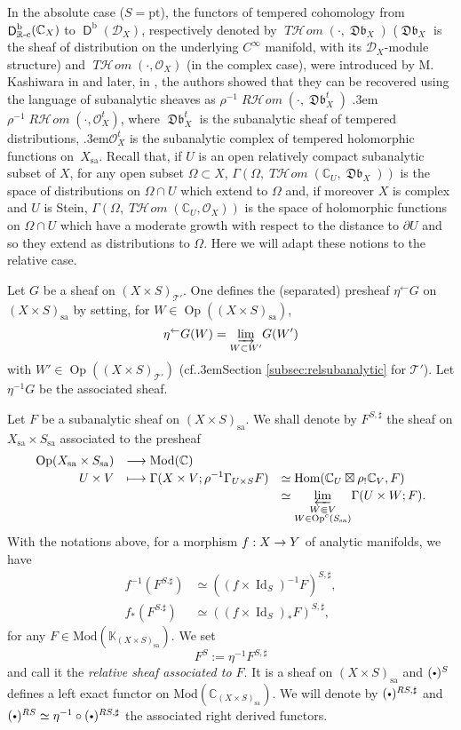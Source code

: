 \documentclass[english]{smfart}
\numberwithin{subsection}{section}
\def\shd{\mathcal{D}}\let\cD\shd
\def\sho{\mathcal{O}}\let\cO\sho
\def\sht{\mathcal{T}}
\newcommand{\C}{\mathbb{C}}\let\CC\C
\newcommand{\R}{\mathbb{R}}\let\RR\R
\newcommand{\shhom}{\mathcal{H}\!\mathit{om}}\let\ho\shhom
\DeclareMathOperator{\rh}{\mathit{R}\shhom}
\DeclareMathOperator{\tho}{\mathit{T}\shhom}
\newcommand{\rb}{\mathrm{b}}
\newcommand{\Mod}{\mathrm{Mod}}
\newcommand{\imin}[1]{#1^{-1}}
\newcommand{\sa}{\mathrm{sa}}
\newcommand{\rc}{{\R\textup{-c}}}
\newcommand{\XS}{X\times S}
\newcommand{\lind}[1]{\underset{#1}{\varinjlim}}
\newcommand{\lpro}[1]{\underset{#1}{\varprojlim}}
\DeclareMathOperator{\rD}{\mathsf{D}}
\DeclareMathOperator{\Db}{\mathfrak{Db}}
\DeclareMathOperator{\Hom}{Hom}
\DeclareMathOperator{\id}{Id}\let\Id\id
\DeclareMathOperator{\Op}{Op}
\def\cf{cf.\kern.3em}
\def\resp{\text{resp.}\kern.3em}
\newcommand{\cbbullet}{{\raisebox{1pt}{$\sbullet$}}}
\newcommand{\sbullet}{{\scriptscriptstyle\bullet}}
\numberwithin{equation}{section}
\theoremstyle{plain}
\theoremstyle{definition}
\def\to{\mathchoice{\longrightarrow}{\rightarrow}{\rightarrow}{\rightarrow}}
\def\mto{\mathchoice{\longmapsto}{\mapsto}{\mapsto}{\mapsto}}
\begin{document}
In the absolute case ($S=\mathrm{pt}$), the functors of tempered cohomology from $\rD^\rb_{\rc}(\C_X)$ to $\rD^\rb(\shd_X)$, respectively denoted by $\tho(\cdot,\Db_X)$ ($\Db_X$ is the sheaf of distribution on the underlying $C^\infty$ manifold, with its $\cD_X$-module structure) and $\tho(\cdot,\sho_X)$ (in the complex case), were introduced by M. Kashiwara in \cite{Kashiwara84} and later, in \cite{K-S01}, the authors showed that they can be recovered using the language of subanalytic sheaves as $\rho^{-1}\rh(\cdot, \Db_X^t)$ \resp $\rho^{-1}\rh(\cdot,\sho_X^t)$, where $\Db_X^t$ is the subanalytic sheaf of tempered distributions, \resp $\sho_X^t$ is the subanalytic complex of tempered holomorphic functions on~$X_{\sa}$.
Recall that, if $U$ is an open relatively compact subanalytic subset of $X$, for any open subset $\Omega\subset X$, $\Gamma(\Omega, \tho(\C_U,\Db_X))$ is the space of distributions on $\Omega\cap U$ which extend to $\Omega$ and, if moreover $X$ is complex and $U$ is Stein, \hbox{$\Gamma(\Omega, \tho(\C_U, \sho_X))$} is the space of holomorphic functions on $\Omega\cap U$ which have a moderate growth with respect to the distance to $\partial U$ and so they extend as distributions to $\Omega$.
Here we will adapt these notions to the relative case.

Let $G$ be a sheaf on $(\XS)_{\sht'}$. One defines the (separated) presheaf $\eta^\gets G$ on $(\XS)_\sa$ by setting, for $W \in \Op((\XS)_\sa)$,
$$
\eta^\gets G(W)= \lind {W \subset W'}G(W')
$$
with $W' \in \Op((\XS)_{\sht'})$ (\cf Section \ref{subsec:relsubanalytic} for $\sht'$). Let $\imin\eta G$ be the associated sheaf.

Let $F$ be a subanalytic sheaf on $(\XS)_\sa$. We shall denote by $F^{S,\sharp}$ the sheaf on $X_\sa \times S_\sa$ associated to the presheaf
\[
\begin{array}{rll}
\Op(X_\sa \times S_\sa) & \displaystyle\to \Mod(\C)& \\[2pt]
U \times V & \displaystyle\mto \Gamma(X \times V;\imin\rho\Gamma_{U \times S}F) &\simeq \Hom(\CC_U \boxtimes \rho_!\CC_V,F) \\[2pt]
&& \simeq \lpro {\substack{W \Subset V\\ W\in\Op^c(S_\sa)}}\Gamma(U \times W;F).
\end{array}
\]
With the notations above, for a morphism $f:X\to Y$ of analytic manifolds, we have
\begin{align*}
f^{-1}(F^{S.\sharp})&\simeq ((f\times \id_S)^{-1}F)^{S,\sharp},\\
f_*(F^{S.\sharp})&\simeq ((f\times \id_S)_*F)^{S,\sharp},
\end{align*}
for any $F\in\Mod(\mathbb{K}_{(\XS)_\sa})$. We set
\begin{equation}\label{E:100}
F^{S}:=\imin\eta F^{S,\sharp}
\end{equation}
and call it the \emph{relative sheaf associated to $F$}. It is a sheaf on $(X \times S)_\sa$ and $(\cbbullet)^S$ defines a left exact functor on $\Mod(\CC_{(X \times S)_\sa})$. We will denote by $(\cbbullet)^{RS,\sharp}$ and $(\cbbullet)^{RS} \simeq \imin\eta \circ (\cbbullet)^{RS,\sharp}$ the associated right derived functors.
\end{document}
